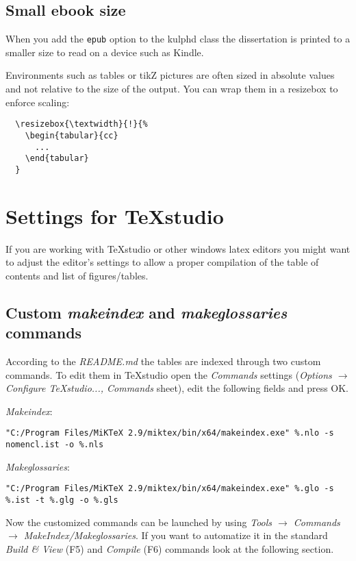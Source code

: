 \subsection{Small ebook size}

When you add the \texttt{epub} option to the kulphd class the dissertation is
printed to a smaller size to read on a device such as Kindle.

Environments such as tables or tikZ pictures are often sized in absolute values
and not relative to the size of the output. You can wrap them in a resizebox
to enforce scaling:

\begin{verbatim}
  \resizebox{\textwidth}{!}{%
    \begin{tabular}{cc}
      ...
    \end{tabular}
  }
\end{verbatim}

\section{Settings for TeXstudio}

If you are working with TeXstudio or other windows latex editors you might want to adjust the editor's settings to allow a proper compilation of the table of contents and list of figures/tables.

\subsection{Custom \textit{makeindex} and \textit{makeglossaries} commands}

According to the \textit{README.md} the tables are indexed through two custom commands. To edit them in TeXstudio open the \textit{Commands} settings (\textit{Options $\to$ Configure TeXstudio...,  Commands} sheet), edit the following fields and press OK.

\textit{Makeindex}:
{\scriptsize
\begin{verbatim}
"C:/Program Files/MiKTeX 2.9/miktex/bin/x64/makeindex.exe" %.nlo -s nomencl.ist -o %.nls
\end{verbatim}}

\textit{Makeglossaries}:
{\scriptsize
\begin{verbatim}
"C:/Program Files/MiKTeX 2.9/miktex/bin/x64/makeindex.exe" %.glo -s %.ist -t %.glg -o %.gls
\end{verbatim}}

Now the customized commands can be launched by using \textit{Tools $\to$ Commands $\to$ MakeIndex/Makeglossaries}. If you want to automatize it in the standard \textit{Build \& View} (F5) and \textit{Compile} (F6) commands look at the following section.

